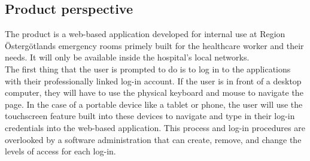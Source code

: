 \subsection{Product perspective}
\label{sec:dataset:subsection}
The product is a web-based application developed for internal use at Region Östergötlands emergency rooms primely built for the healthcare worker and their needs. It will only be available inside the hospital's local networks. 
\\
The first thing that the user is prompted to do is to log in to the applications with their professionally linked log-in account. If the user is in front of a desktop computer, they will have to use the physical keyboard and mouse to navigate the page. In the case of a portable device like a tablet or phone, the user will use the touchscreen feature built into these devices to navigate and type in their log-in credentials into the web-based application. This process and log-in procedures are overlooked by a software administration that can create, remove, and change the levels of access for each log-in.
\\

